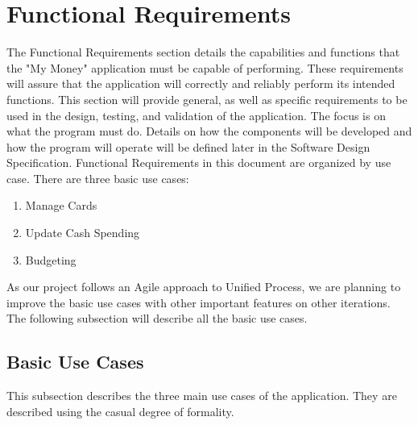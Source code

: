 \documentclass[12pt]{article}
\begin{document}
\section{Functional Requirements}
The Functional Requirements section details the capabilities and functions that the "My Money" application must be capable of performing. These requirements will assure that the application will correctly and reliably perform its intended functions. This section will provide general, as well as specific requirements to be used in the design, testing, and validation of the application. The focus is on what the program must do. Details on how the components will be developed and how the program will operate will be defined later in the Software Design Specification.
Functional Requirements in this document are organized by use case. There are three basic use cases:
\begin{enumerate}
  \item Manage Cards
  \item Update Cash Spending
  \item Budgeting
\end{enumerate}
As our project follows an Agile approach to Unified Process, we are planning to improve the basic use cases with other important features on other iterations.
The following subsection will describe all the basic use cases.

\subsection{Basic Use Cases}

This subsection describes the three main use cases of the application. They are described using the casual degree of formality.
\end{document}
